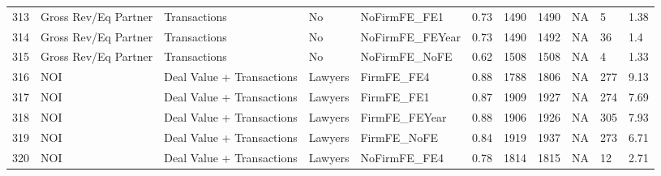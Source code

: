 \begin{table}[ht]
\begin{tabular}{rllllllllll}
  313 & Gross Rev/Eq Partner & Transactions & No & NoFirmFE\_FE1 & 0.73 & 1490 & 1490 & NA & 5 & 1.38 \\ 
  314 & Gross Rev/Eq Partner & Transactions & No & NoFirmFE\_FEYear & 0.73 & 1490 & 1492 & NA & 36 & 1.4 \\ 
  315 & Gross Rev/Eq Partner & Transactions & No & NoFirmFE\_NoFE & 0.62 & 1508 & 1508 & NA & 4 & 1.33 \\ 
  316 & NOI & Deal Value + Transactions & Lawyers & FirmFE\_FE4 & 0.88 & 1788 & 1806 & NA & 277 & 9.13 \\ 
  317 & NOI & Deal Value + Transactions & Lawyers & FirmFE\_FE1 & 0.87 & 1909 & 1927 & NA & 274 & 7.69 \\ 
  318 & NOI & Deal Value + Transactions & Lawyers & FirmFE\_FEYear & 0.88 & 1906 & 1926 & NA & 305 & 7.93 \\ 
  319 & NOI & Deal Value + Transactions & Lawyers & FirmFE\_NoFE & 0.84 & 1919 & 1937 & NA & 273 & 6.71 \\ 
  320 & NOI & Deal Value + Transactions & Lawyers & NoFirmFE\_FE4 & 0.78 & 1814 & 1815 & NA & 12 & 2.71 \\ 
   \hline
\end{tabular}
\end{table}
